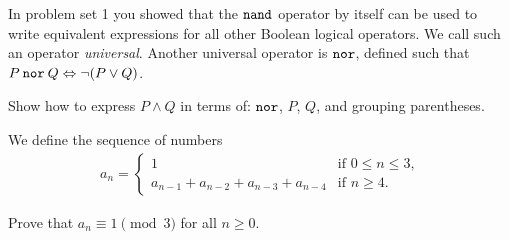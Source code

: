 \documentclass[12pt,oneside]{article}
\begin{document}
%
\instatements{\newpage}
\begin{problem}{10}
In problem set 1 you showed that the $\mathbin{\mathtt{nand}}$ operator by itself can be used to write equivalent expressions for all other Boolean logical operators. We call such an operator \emph{universal}. Another universal operator is $\mathbin{\mathtt{nor}}$, defined such that $P \mathbin{\mathtt{nor}} Q \Leftrightarrow \neg (P \lor Q)$.

Show how to express $P \land Q$ in terms of: $\mathbin{\mathtt{nor}}$, $P$, $Q$, and grouping parentheses.


\end{problem}


%
\begin{problem}{15}
We define the sequence of numbers
\begin{eqnarray*}
a_n = \begin{cases}
  1                                    &  \text{if $0 \leq n \leq 3$,}\\
  a_{n-1} + a_{n-2} + a_{n-3}+ a_{n-4} &  \text{if $n \geq 4$.}
 \end{cases}
\end{eqnarray*}

Prove that $a_n \equiv 1 \pmod{3}$ for all $n\geq 0$. 


\end{problem}
\end{document}
